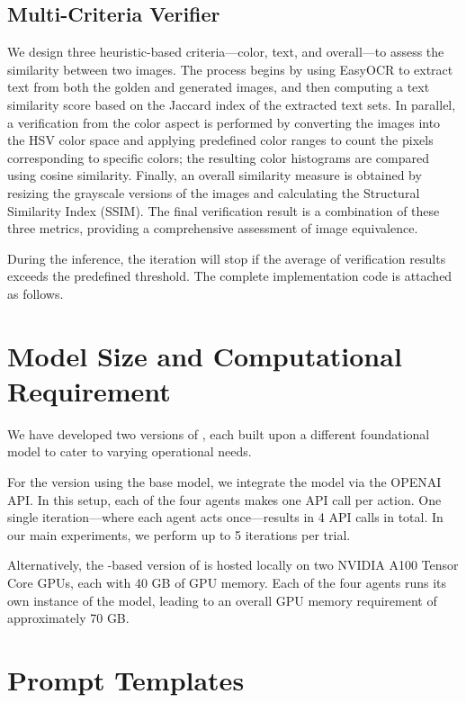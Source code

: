\subsection{Multi-Criteria Verifier}
\label{app:verifier}

We design three heuristic-based criteria—color, text, and overall—to assess the similarity between two images. The process begins by using EasyOCR to extract text from both the golden and generated images, and then computing a text similarity score based on the Jaccard index of the extracted text sets. In parallel, a verification from the color aspect is performed by converting the images into the HSV color space and applying predefined color ranges to count the pixels corresponding to specific colors; the resulting color histograms are compared using cosine similarity. Finally, an overall similarity measure is obtained by resizing the grayscale versions of the images and calculating the Structural Similarity Index (SSIM). The final verification result is a combination of these three metrics, providing a comprehensive assessment of image equivalence.

During the inference, the iteration will stop if the average of verification results exceeds the predefined threshold. The complete implementation code is attached as follows.




\section{Model Size and Computational Requirement}
\label{app:model_size}

We have developed two versions of \model{}, each built upon a different foundational model to cater to varying operational needs.

For the version using the \gpt base model, we integrate the model via the OPENAI API. In this setup, each of the four agents makes one API call per action. One single iteration—where each agent acts once—results in 4 API calls in total. In our main experiments, we perform up to 5 iterations per trial.

Alternatively, the \llama-based version of \model{} is hosted locally on two NVIDIA A100 Tensor Core GPUs, each with 40 GB of GPU memory. Each of the four agents runs its own instance of the \llama model, leading to an overall GPU memory requirement of approximately 70 GB.

\section{Prompt Templates}
\label{app:prompts}

